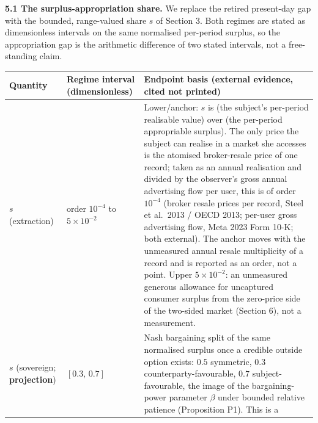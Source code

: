 \documentclass[
  11pt,
]{article}
\newcounter{none} %
\begin{document}
\textbf{5.1 The surplus-appropriation share.} We replace the retired
present-day gap with the bounded, range-valued share \(s\) of Section 3.
Both regimes are stated as dimensionless intervals on the same
normalised per-period surplus, so the appropriation gap is the
arithmetic difference of two stated intervals, not a free-standing
claim.

{\def\LTcaptype{none} %
\begin{longtable}[]{@{}
  >{\raggedright\arraybackslash}p{}
  >{\raggedright\arraybackslash}p{}
  >{\raggedright\arraybackslash}p{}@{}}
\toprule\noalign{}
\begin{minipage}[b]{\linewidth}\raggedright
Quantity
\end{minipage} & \begin{minipage}[b]{\linewidth}\raggedright
Regime interval (dimensionless)
\end{minipage} & \begin{minipage}[b]{\linewidth}\raggedright
Endpoint basis (external evidence, cited not printed)
\end{minipage} \\
\midrule\noalign{}
\endhead
\bottomrule\noalign{}
\endlastfoot
\(s\) (extraction) & order \(10^{-4}\) to \(5\times10^{-2}\) &
Lower/anchor: \(s\) is (the subject's per-period realisable value) over
(the per-period appropriable surplus). The only price the subject can
realise in a market she accesses is the atomised broker-resale price of
one record; taken as an annual realisation and divided by the observer's
gross annual advertising flow per user, this is of order \(10^{-4}\)
(broker resale prices per record, Steel et al.~2013 / OECD 2013;
per-user gross advertising flow, Meta 2023 Form 10-K; both external).
The anchor moves with the unmeasured annual resale multiplicity of a
record and is reported as an order, not a point. Upper
\(5\times10^{-2}\): an unmeasured generous allowance for uncaptured
consumer surplus from the zero-price side of the two-sided market
(Section 6), not a measurement. \\
\(s\) (sovereign; \textbf{projection}) & \([0.3,\,0.7]\) & Nash
bargaining split of the same normalised surplus once a credible outside
option exists: \(0.5\) symmetric, \(0.3\) counterparty-favourable,
\(0.7\) subject-favourable, the image of the bargaining-power parameter
\(\beta\) under bounded relative patience (Proposition P1). This is a

\end{longtable}}
\end{document}
